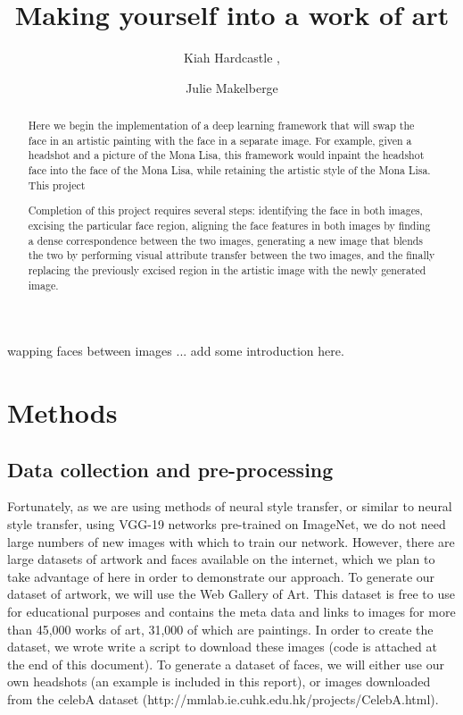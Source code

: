 \documentclass{pnastwo2}
\begin{document}
\title{Making yourself into a work of art}

\author{Kiah Hardcastle ,
\and Julie Makelberge}


\maketitle

\begin{article}

\begin{abstract}

Here we begin the implementation of a deep learning framework that will swap the face in an artistic painting with the face in a separate image. For example, given a headshot and a picture of the Mona Lisa, this framework would inpaint the headshot face into the face of the Mona Lisa, while retaining the artistic style of the Mona Lisa. This project 

Completion of this project requires several steps: identifying the face in both images, excising the particular face region, aligning the face features in both images by finding a dense correspondence between the two images, generating a new image that blends the two by performing visual attribute transfer between the two images, and the finally replacing the previously excised region in the artistic image with the newly generated image.

\end{abstract}

wapping faces between images ... add some introduction here.

\section{Methods}
\subsection{Data collection and pre-processing}

Fortunately, as we are using methods of neural style transfer, or similar to neural style transfer, using VGG-19 networks pre-trained on ImageNet, we do not need large numbers of new images with which to train our network. However, there are large datasets of artwork and faces available on the internet, which we plan to take advantage of here in order to demonstrate our approach. To generate our dataset of artwork, we will use the Web Gallery of Art. This dataset is free to use for educational purposes and contains the meta data and links to images for more than 45,000 works of art, 31,000 of which are paintings. In order to create the dataset, we wrote write a script to download these images (code is attached at the end of this document). To generate a dataset of faces, we will either use our own headshots (an example is included in this report), or images downloaded from the celebA dataset (http://mmlab.ie.cuhk.edu.hk/projects/CelebA.html). 



\end{article}
\end{document}
